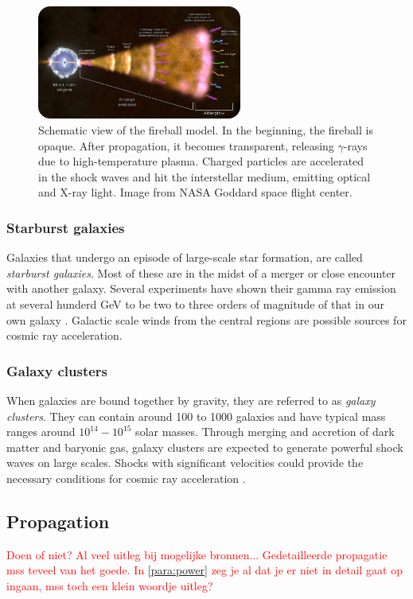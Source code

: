 \begin{figure}
\centering
\includegraphics[width=0.6\textwidth]{chapter3/img/fireball_rounded.jpg}
\caption{Schematic view of the fireball model. In the beginning, the fireball is opaque. After propagation, it becomes transparent, releasing $\gamma$-rays due to high-temperature plasma. Charged particles are accelerated in the shock waves and hit the interstellar medium, emitting optical and X-ray light. Image from NASA Goddard space flight center.}
\end{figure}

\subsubsection{Starburst galaxies}
Galaxies that undergo an episode of large-scale star formation, are called \textit{starburst galaxies}. Most of these are in the midst of a merger or close encounter with another galaxy. Several experiments have shown their gamma ray emission at several hunderd GeV to be two to three orders of magnitude of that in our own galaxy \cite{Acero:2009nb,Karlsson:2009hd}. Galactic scale winds from the central regions are possible sources for cosmic ray acceleration.

\subsubsection{Galaxy clusters}
When galaxies are bound together by gravity, they are referred to as \textit{galaxy clusters}. They can contain around 100 to 1000 galaxies and have typical mass ranges around $10^{14}-10^{15}$ solar masses. Through merging and accretion of dark matter and baryonic gas, galaxy clusters are expected to generate powerful shock waves on large scales. Shocks with significant velocities could provide the necessary conditions for cosmic ray acceleration \cite{1538-4357-689-2-L105}.

\subsection{Propagation}
\label{subsec:propagation}
\textcolor{red}{Doen of niet? Al veel uitleg bij mogelijke bronnen... Gedetailleerde propagatie mss teveel van het goede. In \ref{para:power} zeg je al dat je er niet in detail gaat op ingaan, mss toch een klein woordje uitleg?}


